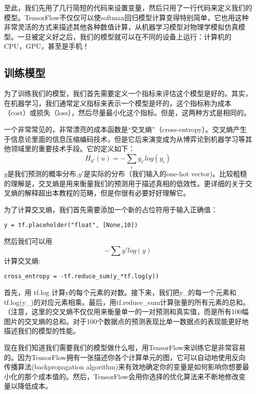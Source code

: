 至此，我们先用了几行简短的代码来设置变量，然后只用了一行代码来定义我们的模型。TensorFlow不仅仅可以使softmax回归模型计算变得特别简单，它也用这种非常灵活的方式来描述其他各种数值计算，从机器学习模型对物理学模拟仿真模型。一旦被定义好之后，我们的模型就可以在不同的设备上运行：计算机的CPU，GPU，甚至是手机！

\subsection{训练模型}
为了训练我们的模型，我们首先需要定义一个指标来评估这个模型是好的。其实，在机器学习，我们通常定义指标来表示一个模型是坏的，这个指标称为成本（cost）或损失（loss），然后尽量最小化这个指标。但是，这两种方式是相同的。

一个非常常见的，非常漂亮的成本函数是“交叉熵”（cross-entropy）。交叉熵产生于信息论里面的信息压缩编码技术，但是它后来演变成为从博弈论到机器学习等其他领域里的重要技术手段。它的定义如下：
\begin{equation}
H_{y'}(u) = -\sum_i{y_{i'}log(y_i)}
\end{equation}
$y$是我们预测的概率分布,$y'$是实际的分布（我们输入的one-hot vector)。比较粗糙的理解是，交叉熵是用来衡量我们的预测用于描述真相的低效性。更详细的关于交叉熵的解释超出本教程的范畴，但是你很有必要好好理解它。

为了计算交叉熵，我们首先需要添加一个新的占位符用于输入正确值：
\begin{lstlisting}
y = tf.placeholder("float", [None,10])
\end{lstlisting}
然后我们可以用
\begin{equation}
-\sum{y'log(y)}
\end{equation}
计算交叉熵:

\begin{lstlisting}
cross_entropy = -tf.reduce_sum(y_*tf.log(y))
\end{lstlisting}

首先，用 tf.log 计算y的每个元素的对数。接下来，我们把y\_的每一个元素和tf.log(y\_)的对应元素相乘。最后，用tf.reduce\_sum计算张量的所有元素的总和。（注意，这里的交叉熵不仅仅用来衡量单一的一对预测和真实值，而是所有100幅图片的交叉熵的总和。对于100个数据点的预测表现比单一数据点的表现能更好地描述我们的模型的性能。

现在我们知道我们需要我们的模型做什么啦，用TensorFlow来训练它是非常容易的。因为TensorFlow拥有一张描述你各个计算单元的图，它可以自动地使用反向传播算法(backpropagation algorithm)来有效地确定你的变量是如何影响你想要最小化的那个成本值的。然后，TensorFlow会用你选择的优化算法来不断地修改变量以降低成本。


